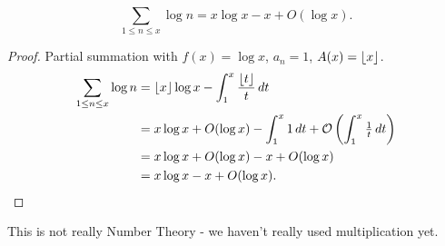 \documentclass{article}
\newcommand{\bigO}{\mathcal{O}}
\DeclarePairedDelimiter\floor{\lfloor}{\rfloor}
\begin{document}
\begin{nlemma}
  \begin{equation*}
    \sum_{1 \leq n \leq x} \log n = x \log x - x + O(\log x).
  \end{equation*}
\end{nlemma}
\begin{proof}
  Partial summation with $f(x) = \log x$, $a_n = 1$, $A(x) = \floor{x}$.
  \begin{align*}
    \sum_{1 \leq n \leq x} \log n &= \floor{x} \log x - \int_1^x \frac{\floor{t}}{t} \, dt \\
                                  &= x \log x + O(\log x) - \int_1^x 1 \, dt + \bigO\left(\int_1^x \tfrac{1}{t} \, dt\right) \\
                                  &= x \log x + O(\log x) - x + O(\log x) \\
                                  &= x \log x - x + O(\log x). \qedhere
  \end{align*}
\end{proof}
This is not really Number Theory - we haven't really used multiplication yet.
\end{document}
